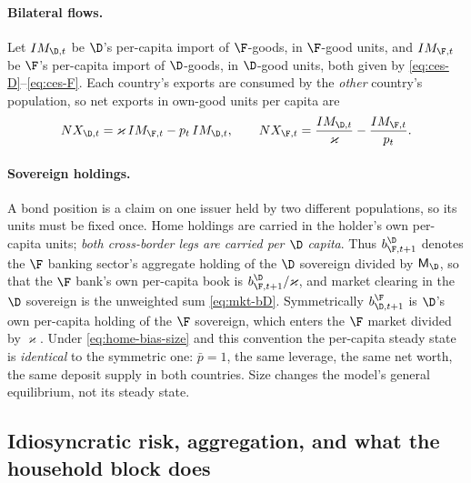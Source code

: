 \paragraph{Bilateral flows.} Let $IM_{\D,t}$ be $\D$'s per-capita import of
$\F$-goods, in $\F$-good units, and $IM_{\F,t}$ be $\F$'s per-capita import of
$\D$-goods, in $\D$-good units, both given by \eqref{eq:ces-D}--\eqref{eq:ces-F}.
Each country's exports are consumed by the \emph{other} country's population, so
net exports in own-good units per capita are
\begin{equation}
NX_{\D,t}=\varkappa\,IM_{\F,t}-p_t\,IM_{\D,t},
\qquad
NX_{\F,t}=\frac{IM_{\D,t}}{\varkappa}-\frac{IM_{\F,t}}{p_t}.
\label{eq:nx}
\end{equation}

\paragraph{Sovereign holdings.} A bond position is a claim on one issuer held by
two different populations, so its units must be fixed once. Home holdings are
carried in the holder's own per-capita units; \emph{both cross-border legs are
carried per $\D$ capita}. Thus $b^{\D}_{\F,t+1}$ denotes the $\F$ banking
sector's aggregate holding of the $\D$ sovereign divided by $\mathsf{M}_\D$, so
that the $\F$ bank's own per-capita book is $b^{\D}_{\F,t+1}/\varkappa$, and
market clearing in the $\D$ sovereign is the unweighted sum
\eqref{eq:mkt-bD}. Symmetrically $b^{\F}_{\D,t+1}$ is $\D$'s own per-capita
holding of the $\F$ sovereign, which enters the $\F$ market divided by
$\varkappa$. Under \eqref{eq:home-bias-size} and this convention the per-capita
steady state is \emph{identical} to the symmetric one: $\bar p=1$, the same
leverage, the same net worth, the same deposit supply in both countries. Size
changes the model's general equilibrium, not its steady state.


\subsection{Idiosyncratic risk, aggregation, and what the household block does}
\label{sec:hh-aggregation}

